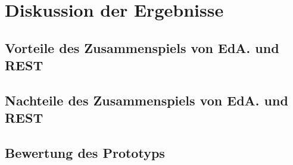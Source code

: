 \section{Diskussion der Ergebnisse}
\subsection{Vorteile des Zusammenspiels von EdA. und REST}
\subsection{Nachteile des Zusammenspiels von EdA. und REST}
\subsection{Bewertung des Prototyps} 
